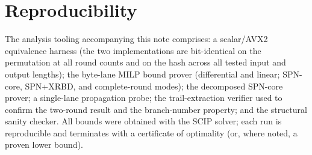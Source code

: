 \documentclass[11pt,a4paper]{article}
\begin{document}
\section*{Reproducibility}

The analysis tooling accompanying this note comprises: a scalar/AVX2 equivalence
harness (the two implementations are bit-identical on the permutation at all
round counts and on the hash across all tested input and output lengths); the
byte-lane MILP bound prover (differential and linear; SPN-core, SPN+XRBD, and
complete-round modes); the decomposed SPN-core prover; a single-lane propagation
probe; the trail-extraction verifier used to confirm the two-round result and
the branch-number property; and the structural sanity checker. All bounds were
obtained with the SCIP solver; each run is reproducible and terminates with a
certificate of optimality (or, where noted, a proven lower bound).
\end{document}
